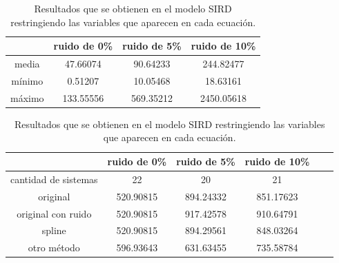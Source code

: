 \begin{table}[!h]
    \centering
    \caption{Resultados que se obtienen en el modelo SIRD restringiendo las variables que aparecen en cada ecuación.}
    \begin{tabular}{|c|c|c|c|}
        \hline
               & \textbf{ruido de 0\%} & \textbf{ruido de 5\%} & \textbf{ruido de 10\%} \\
        \hline
        media  & 47.66074              & 90.64233              & 244.82477              \\
        \hline
        mínimo & 0.51207               & 10.05468              & 18.63161               \\
        \hline
        máximo & 133.55556             & 569.35212             & 2450.05618             \\
        \hline
    \end{tabular}

    \begin{tabular}{|c|c|c|c|c|c|}
        \hline
                             & \textbf{ruido de 0\%} & \textbf{ruido de 5\%} & \textbf{ruido de 10\%} \\
        \hline
        cantidad de sistemas & 22                    & 20                    & 21                     \\
        \hline
        original             & 520.90815             & 894.24332             & 851.17623              \\
        \hline
        original con ruido   & 520.90815             & 917.42578             & 910.64791              \\
        \hline
        spline               & 520.90815             & 894.29561             & 848.03264              \\
        \hline
        otro método          & 596.93643             & 631.63455             & 735.58784              \\
        \hline
    \end{tabular}
    \label{table:experiment_SIRD}
\end{table}

